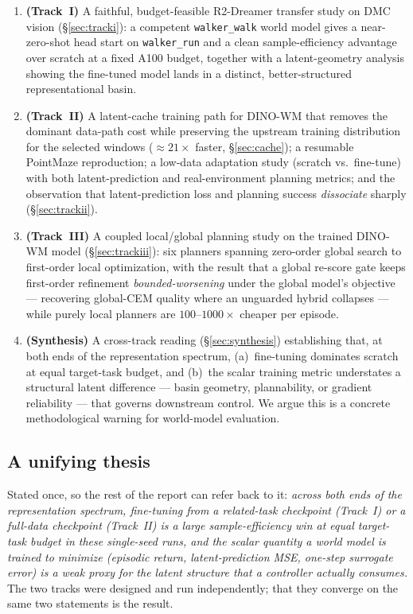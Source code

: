 \documentclass[11pt,a4paper]{article}
\begin{document}
\begin{enumerate}[leftmargin=1.5em,itemsep=2pt]
\item \textbf{(Track~I)} A faithful, budget-feasible R2-Dreamer transfer study
  on DMC vision (\S\ref{sec:tracki}): a competent \texttt{walker\_walk} world
  model gives a near-zero-shot head start on \texttt{walker\_run} and a clean
  sample-efficiency advantage over scratch at a fixed A100 budget, together with
  a latent-geometry analysis showing the fine-tuned model lands in a distinct,
  better-structured representational basin.
\item \textbf{(Track~II)} A latent-cache training path for DINO-WM that removes
  the dominant data-path cost while preserving the upstream training
  distribution for the selected windows ($\approx\!21\times$ faster, \S\ref{sec:cache}); a resumable
  PointMaze reproduction; a low-data adaptation study (scratch vs.\ fine-tune)
  with both latent-prediction and real-environment planning metrics; and the
  observation that latent-prediction loss and planning success
  \emph{dissociate} sharply (\S\ref{sec:trackii}).
\item \textbf{(Track~III)} A coupled local/global planning study on the trained
  DINO-WM model (\S\ref{sec:trackiii}): six planners spanning zero-order global
  search to first-order local optimization, with the result that a global
  re-score gate keeps first-order refinement \emph{bounded-worsening} under the
  global model's objective --- recovering global-CEM quality where an unguarded
  hybrid collapses --- while purely local planners are $100$--$1000\times$
  cheaper per episode.
\item \textbf{(Synthesis)} A cross-track reading (\S\ref{sec:synthesis})
  establishing that, at both ends of the representation spectrum, (a)~fine-tuning
  dominates scratch at equal target-task budget, and (b)~the scalar training metric
  understates a structural latent difference --- basin geometry, plannability,
  or gradient reliability --- that governs downstream control. We argue this is
  a concrete methodological warning for world-model evaluation.
\end{enumerate}

\subsection{A unifying thesis}
\label{sec:thesis}

Stated once, so the rest of the report can refer back to it: \emph{across both
ends of the representation spectrum, fine-tuning from a related-task checkpoint
(Track~I) or a full-data checkpoint (Track~II) is a large sample-efficiency win
at equal target-task budget in these single-seed runs, and the scalar quantity a world
model is trained to minimize (episodic return, latent-prediction MSE,
one-step surrogate error) is a weak proxy for the latent structure that a
controller actually consumes.} The two tracks were designed and run
independently; that they converge on the same two statements is the result.
\end{document}
